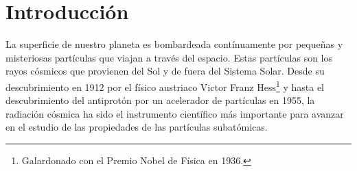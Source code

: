 

\chapter{Introducción}\label{cap.intro}



La superficie de nuestro planeta es bombardeada contínuamente por pequeñas y misteriosas partículas que viajan a través del espacio. Estas partículas son los rayos cósmicos que provienen del Sol y de fuera del Sistema Solar. Desde su descubrimiento en 1912 por el físico austriaco Victor Franz Hess\footnote{Galardonado con el Premio Nobel de Física en 1936.} y hasta el descubrimiento del antiprotón por un acelerador de partículas en 1955, la radiación cósmica ha sido el instrumento científico más importante para avanzar en el estudio de las propiedades de las partículas subatómicas\cite{rev}.\\


